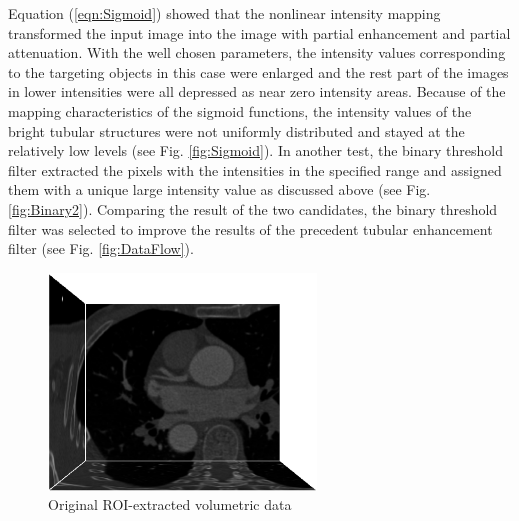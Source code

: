 Equation (\ref{eqn:Sigmoid}) showed that the nonlinear intensity mapping transformed the input image into the image with partial enhancement and partial attenuation.
With the well chosen parameters, the intensity values corresponding to the targeting objects in this case were enlarged and the rest part of the images in lower intensities were all depressed as near zero intensity areas. %
Because of the mapping characteristics of the sigmoid functions, the intensity values of the bright tubular structures were not uniformly distributed and stayed at the relatively low levels (see Fig. \ref{fig:Sigmoid}). %
In another test, the binary threshold filter extracted the pixels with the intensities in the specified range and assigned them with a unique large intensity value as discussed above (see Fig. \ref{fig:Binary2}). %
Comparing the result of the two candidates, the binary threshold filter was selected to improve the results of the precedent tubular enhancement filter (see Fig. \ref{fig:DataFlow}). %
\begin{figure}[t]
\centering
\includegraphics[width=2.8in]{figures/chap04/original.eps}
\caption{Original ROI-extracted volumetric data}
\label{fig:Original}
\end{figure}

